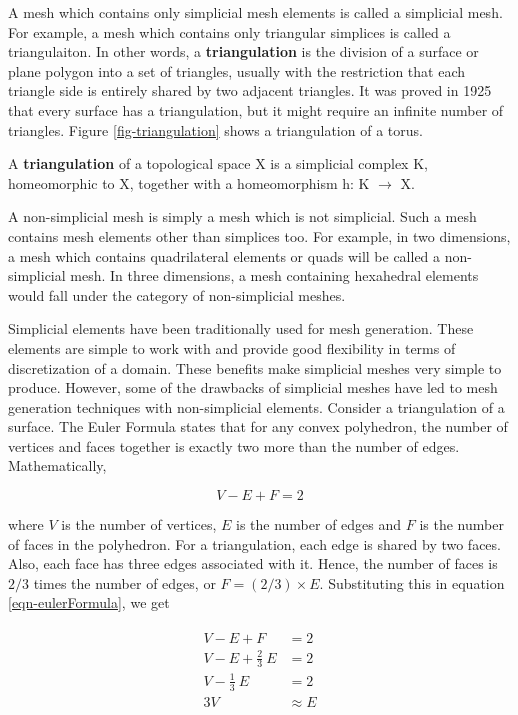A mesh which contains only simplicial mesh elements is called a simplicial mesh. For example, a mesh which contains only triangular simplices is called a triangulaiton. In other words, a \textbf{triangulation} is the division of a surface or plane polygon into a set of triangles, usually with the restriction that each triangle side is entirely shared by two adjacent triangles. It was proved in 1925 that every surface has a triangulation, but it might require an infinite number of triangles. Figure \ref{fig-triangulation} shows a triangulation of a torus.

\begin{definition}
	A \textbf{triangulation} of a topological space X is a simplicial complex K, homeomorphic to X, together with a homeomorphism h: K $\rightarrow$ X.
\end{definition}

A non-simplicial mesh is simply a mesh which is not simplicial. Such a mesh contains mesh elements other than simplices too. For example, in two dimensions, a mesh which contains quadrilateral elements or quads will be called a non-simplicial mesh. In three dimensions, a mesh containing hexahedral elements would fall under the category of non-simplicial meshes.

Simplicial elements have been traditionally used for mesh generation. These elements are simple to work with and provide good flexibility in terms of discretization of a domain. These benefits make simplicial meshes very simple to produce. However, some of the drawbacks of simplicial meshes have led to mesh generation techniques with non-simplicial elements. Consider a triangulation of a surface. The Euler Formula states that for any convex polyhedron, the number of vertices and faces together is exactly two more than the number of edges. Mathematically,

\begin{equation}
V-E+F=2
\label{eqn-eulerFormula}
\end{equation}

where $V$ is the number of vertices, $E$ is the number of edges and $F$ is the number of faces in the polyhedron. For a triangulation, each edge is shared by two faces. Also, each face has three edges associated with it. Hence, the number of faces is $2/3$ times the number of edges, or $F= (2/3) \times E$. Substituting this in equation \ref{eqn-eulerFormula}, we get

\begin{align}
\begin{split}
		V - E + F  & = 2 \\
		V - E + \frac{2}{3} \: E & = 2 \\
		V - \frac{1}{3} \: E & = 2 \\
		3V & \approx E
		\end{split}
\end{align}

